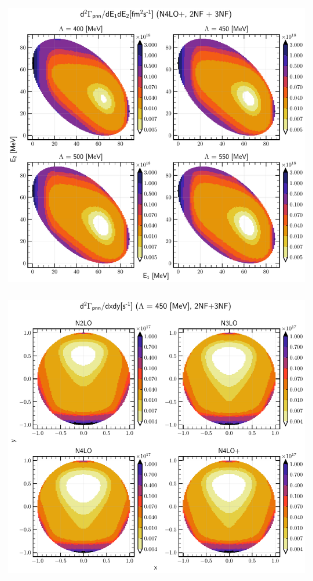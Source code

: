     \begin{figure}[h]
        \begin{center}
        \includegraphics[width=0.7\textwidth]{PlotData/PION/Dalitz_maps/figures/Dalitz_map_pnn_E1E2_cutofs.pdf}
        \end{center}
        \caption{}
        \label{pion_map_E1E2_cutoff}
    \end{figure}

    \begin{figure}[h]
        \begin{center}
        \includegraphics[width=0.7\textwidth]{PlotData/PION/Dalitz_maps/figures/Dalitz_map_pnn_xy_orders.pdf}
        \end{center}
        \caption{}
        \label{pion_map_xy_order}
    \end{figure}

